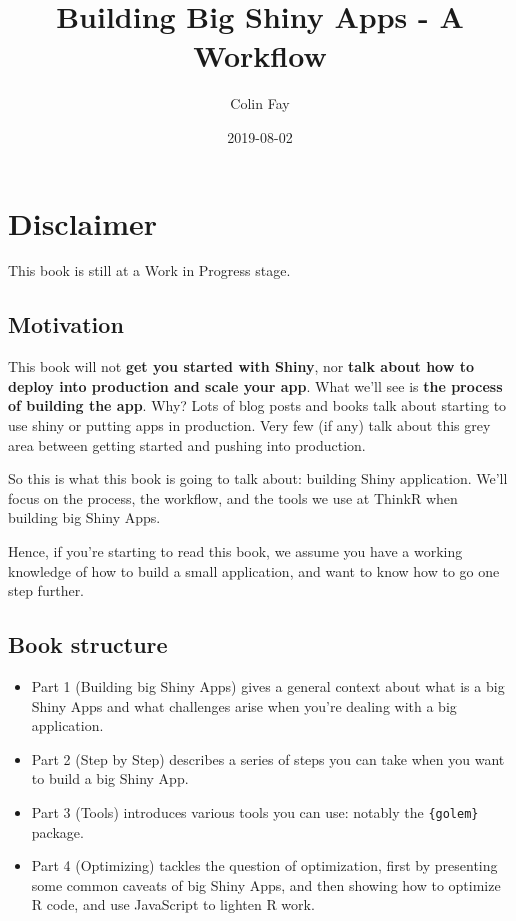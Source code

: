 \documentclass[]{book}
\title{Building Big Shiny Apps - A Workflow}
\author{Colin Fay}
\date{2019-08-02}
\begin{document}
\maketitle

{
\setcounter{tocdepth}{1}
\tableofcontents
}
\hypertarget{disclaimer}{%
\chapter{Disclaimer}\label{disclaimer}}

This book is still at a Work in Progress stage.

\hypertarget{motivation}{%
\section{Motivation}\label{motivation}}

This book will not \textbf{get you started with Shiny}, nor \textbf{talk about how to deploy into production and scale your app}. What we'll see is \textbf{the process of building the app}. Why? Lots of blog posts and books talk about starting to use shiny or putting apps in production. Very few (if any) talk about this grey area between getting started and pushing into production.

So this is what this book is going to talk about: building Shiny application. We'll focus on the process, the workflow, and the tools we use at ThinkR when building big Shiny Apps.

Hence, if you're starting to read this book, we assume you have a working knowledge of how to build a small application, and want to know how to go one step further.

\hypertarget{book-structure}{%
\section{Book structure}\label{book-structure}}

\begin{itemize}
\item
  Part 1 (Building big Shiny Apps) gives a general context about what is a big Shiny Apps and what challenges arise when you're dealing with a big application.
\item
  Part 2 (Step by Step) describes a series of steps you can take when you want to build a big Shiny App.
\item
  Part 3 (Tools) introduces various tools you can use: notably the \texttt{\{golem\}} package.
\item
  Part 4 (Optimizing) tackles the question of optimization, first by presenting some common caveats of big Shiny Apps, and then showing how to optimize R code, and use JavaScript to lighten R work.
\end{itemize}
\end{document}
